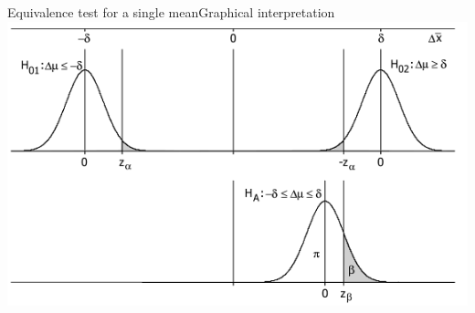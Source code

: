 \begin{frame}{Equivalence test for a single mean}{Graphical interpretation}
\centering\includegraphics[width=.9\textwidth]{../img/TOST-errors.png}
\end{frame}


%


